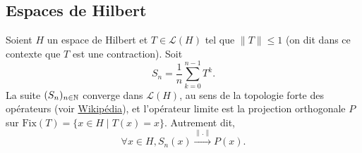 \subsection{Espaces de Hilbert}
\begin{thm}
  Soient $H$ un espace de Hilbert et $T\in\mathcal L(H)$ tel que $\|T\|\leq 1$
  (on dit dans ce contexte que $T$ est une contraction).
  Soit
  $$S_n = \frac{1}{n}\sum_{k=0}^{n-1}T^k.$$
  La suite $(S_n)_{n\in\mathbb{N}}$ converge dans $\mathcal L(H)$, au sens de la
  topologie forte des opérateurs (voir
  \href{https://en.wikipedia.org/wiki/Strong\_operator\_topology}{Wikipédia}),
  et l'opérateur limite est la projection orthogonale $P$ sur
  $\mathrm{Fix}(T) = \{x\in H\mid T(x) = x\}$. Autrement dit,
  $$\forall x \in H, S_n(x)\xrightarrow{\|.\|} P(x).$$
\end{thm}

